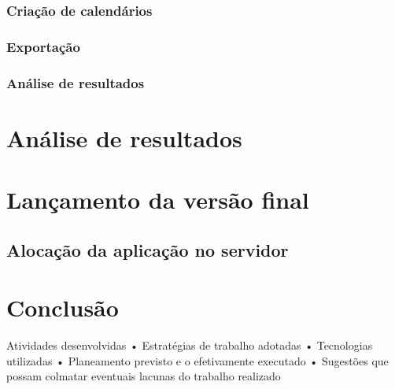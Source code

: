\documentclass[12pt, twoside]{report}
\begin{document}
	\subsection{Criação de calendários}
	\subsection{Exportação}
	
	\subsection{Análise de resultados}
	
	
	
	\chapter{Análise de resultados}
	
	
	
	
	\chapter{Lançamento da versão final}
	
	\section{Alocação da aplicação no servidor}
	
	
	
	\chapter{Conclusão}
	
	Atividades desenvolvidas
	• Estratégias de trabalho adotadas
	• Tecnologias utilizadas
	• Planeamento previsto e o efetivamente executado
	• Sugestões que possam colmatar eventuais lacunas do
	trabalho realizado
	
	
	
	\pagestyle{empty}
	
	
\end{document}
